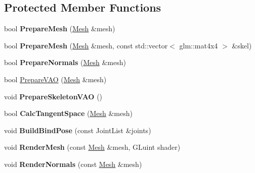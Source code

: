 \subsection*{Protected Member Functions}
\begin{DoxyCompactItemize}
\item 
bool {\bfseries Prepare\+Mesh} (\hyperlink{struct_m_d5_model_1_1_mesh}{Mesh} \&mesh)\hypertarget{class_m_d5_model_af26d86069e82be5f921edb05e883b679}{}\label{class_m_d5_model_af26d86069e82be5f921edb05e883b679}

\item 
bool {\bfseries Prepare\+Mesh} (\hyperlink{struct_m_d5_model_1_1_mesh}{Mesh} \&mesh, const std\+::vector$<$ glm\+::mat4x4 $>$ \&skel)\hypertarget{class_m_d5_model_a6ce9e872bd6343c6aa78b0dec86e34a3}{}\label{class_m_d5_model_a6ce9e872bd6343c6aa78b0dec86e34a3}

\item 
bool {\bfseries Prepare\+Normals} (\hyperlink{struct_m_d5_model_1_1_mesh}{Mesh} \&mesh)\hypertarget{class_m_d5_model_ae3995dbd348a611572e475f49c23b280}{}\label{class_m_d5_model_ae3995dbd348a611572e475f49c23b280}

\item 
bool \hyperlink{class_m_d5_model_a4a875a52a29fea232eee7b3aa11f0143}{Prepare\+V\+AO} (\hyperlink{struct_m_d5_model_1_1_mesh}{Mesh} \&mesh)
\item 
void {\bfseries Prepare\+Skeleton\+V\+AO} ()\hypertarget{class_m_d5_model_a06c13db7b0c28a68ba69e2a83a812957}{}\label{class_m_d5_model_a06c13db7b0c28a68ba69e2a83a812957}

\item 
bool {\bfseries Calc\+Tangent\+Space} (\hyperlink{struct_m_d5_model_1_1_mesh}{Mesh} \&mesh)\hypertarget{class_m_d5_model_ad5476239e7378cc4171e5cd5f6763e3e}{}\label{class_m_d5_model_ad5476239e7378cc4171e5cd5f6763e3e}

\item 
void {\bfseries Build\+Bind\+Pose} (const Joint\+List \&joints)\hypertarget{class_m_d5_model_a95a82596b286a40d3ed7227a2cd47bc3}{}\label{class_m_d5_model_a95a82596b286a40d3ed7227a2cd47bc3}

\item 
void {\bfseries Render\+Mesh} (const \hyperlink{struct_m_d5_model_1_1_mesh}{Mesh} \&mesh, G\+Luint shader)\hypertarget{class_m_d5_model_ae72199c990dca34421aaa77c63ab0b52}{}\label{class_m_d5_model_ae72199c990dca34421aaa77c63ab0b52}

\item 
void {\bfseries Render\+Normals} (const \hyperlink{struct_m_d5_model_1_1_mesh}{Mesh} \&mesh)\hypertarget{class_m_d5_model_a7c8aca7b9dc7a3fd45f7a067327e53f5}{}\label{class_m_d5_model_a7c8aca7b9dc7a3fd45f7a067327e53f5}


\end{DoxyCompactItemize}
